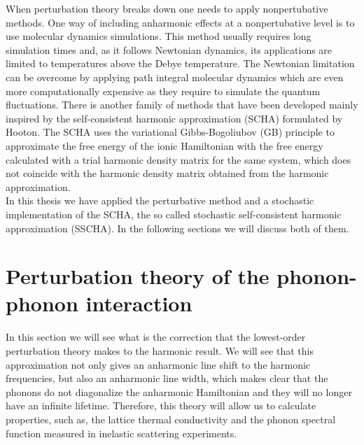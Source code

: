 When perturbation theory breaks down one needs to apply nonpertubative methods. One way of including anharmonic effects at a nonpertubative level is to use molecular dynamics 
simulations\cite{hellman2013temperature,hellman2013temperature1,hellman2011lattice,ljungberg2013temperature,magduau2013identification,wang1990tight,zhang2014phonon,de2009thermal}. This method usually requires long simulation
times and, as it follows Newtonian dynamics, its applications are limited to temperatures above the Debye temperature. The Newtonian limitation can be overcome by applying path integral molecular 
dynamics\cite{ceperley1995path} which are even more computationally expensive as they require to simulate the quantum fluctuations. There is another family of 
methods\cite{errea2014anharmonic,errea2013first,errea2011anharmonic,monserrat2013anharmonic,tadano2015self,georgescu2012self,brown2013self,patrick2015anharmonic,} that have been developed mainly inspired by the 
self-consistent harmonic approximation (SCHA) formulated by Hooton\cite{hooton1955li}. The SCHA uses the variational Gibbs-Bogoliubov (GB) principle to approximate the free energy of the ionic Hamiltonian with 
the free energy calculated with a trial harmonic density matrix for the same system, which does not coincide with the harmonic density matrix obtained from the harmonic approximation. \\

In this thesis we have applied the perturbative method\cite{paulatto2013anharmonic} and a stochastic implementation of the SCHA, the so called stochastic self-consistent 
harmonic approximation (SSCHA)\cite{errea2013first,errea2014anharmonic,bianco2017second,monacelli2018pressure}. In 
the following sections we will discuss both of them.

\section{Perturbation theory of the phonon-phonon interaction}
\label{perturbation-theory-third}

In this section we will see what is the correction that the lowest-order perturbation theory makes to the harmonic 
result. We will see that this approximation not only gives an anharmonic line shift to the harmonic 
frequencies, but also an anharmonic line width, which makes clear that the phonons do not diagonalize the anharmonic Hamiltonian and they will no longer have an infinite lifetime. Therefore, this 
theory will allow us to calculate properties, such as, the lattice thermal conductivity and the phonon spectral function measured in inelastic scattering experiments. \\

